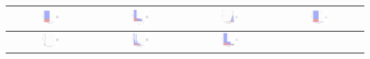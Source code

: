 \begin{table}
	\begin{center} 
		\begin{tabular}{ |c|c|c|c| }
			\hline 
			\includegraphics[width=0.22\textwidth]{NOTEBOOK/IMAGENES_BIRCH_DESCRIPTIVAS/17} 
			& \includegraphics[width=0.22\textwidth]{NOTEBOOK/IMAGENES_BIRCH_DESCRIPTIVAS/18} 
			& \includegraphics[width=0.22\textwidth]{NOTEBOOK/IMAGENES_BIRCH_DESCRIPTIVAS/19} 
			& \includegraphics[width=0.22\textwidth]{NOTEBOOK/IMAGENES_BIRCH_DESCRIPTIVAS/20} 
			\\  \hline
			\includegraphics[width=0.22\textwidth]{NOTEBOOK/IMAGENES_BIRCH_DESCRIPTIVAS/21} 
			& \includegraphics[width=0.22\textwidth]{NOTEBOOK/IMAGENES_BIRCH_DESCRIPTIVAS/22} 
			& \includegraphics[width=0.22\textwidth]{NOTEBOOK/IMAGENES_BIRCH_DESCRIPTIVAS/23} 

\end{tabular}
\end{center}
\end{table}
